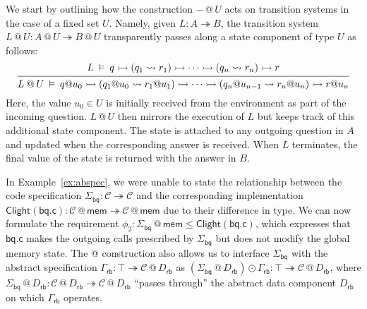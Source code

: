 \documentclass[acmsmall,screen,review,anonymous]{acmart}
\newcommand{\kw}[1]{\ensuremath{ \mathsf{#1} }}
\begin{document}
We start by
outlining how the construction ${-} \mathbin@ U$
acts on transition systems
in the case of a fixed set $U$.
Namely,
given $L : A \twoheadrightarrow B$,
the transition system
$
  L \mathbin@ U : A \mathbin@ U \twoheadrightarrow B \mathbin@ U
$
transparently passes along
a state component of type $U$ as follows:
\begin{equation} \label{eqn:slift}
  \begin{prooftree}
  \hypo{
  L \:\vDash\: q \rightarrowtail
    (q_1 \leadsto r_1) \rightarrowtail
    \cdots \rightarrowtail
    (q_n \leadsto r_n) \rightarrowtail
    r
  }
  \infer1{
  L \mathbin@ U \:\vDash\: q@u_0 \rightarrowtail
    (q_1@u_0 \leadsto r_1@u_1) \rightarrowtail
    \cdots \rightarrowtail
    (q_n@u_{n-1} \leadsto r_n@u_n) \rightarrowtail
    r@u_n
  }
  \end{prooftree}
\end{equation}
Here, the value $u_0 \in U$
is initially received from the environment as part of the incoming question.
$L \mathbin@ U$ then mirrors the execution of $L$
but keeps track of this additional state component.
The state is attached to any outgoing question in $A$
and updated when the corresponding answer is received.
When $L$ terminates,
the final value of the state is returned with the answer in $B$.

\begin{example} \label{ex:abspeclift} %
In Example~\ref{ex:abspec},
we were unable to state the relationship
between the code specification
$\Sigma_\kw{bq} : \mathcal{C} \twoheadrightarrow \mathcal{C}$
and the corresponding implementation
$\kw{Clight}(\kw{bq.c}) : \mathcal{C} \mathbin@ \kw{mem}
 \twoheadrightarrow \mathcal{C} \mathbin@ \kw{mem}$
due to their difference in type.
We can now formulate the requirement
$
  \phi_2 : \Sigma_\kw{bq} \mathbin@ \kw{mem} \le \kw{Clight}(\kw{bq.c})
$,
which expresses that $\kw{bq.c}$
makes the outgoing calls prescribed by $\Sigma_\kw{bq}$
but does not modify the global memory state.
The $@$ construction also allows us to interface $\Sigma_\kw{bq}$
with the abstract specification
$\Gamma_\kw{rb} : \top \twoheadrightarrow \mathcal{C} \mathbin@ D_\kw{rb}$
as
$
  (\Sigma_\kw{bq} \mathbin@ D_\kw{rb}) \odot \Gamma_\kw{rb} :
  \top \twoheadrightarrow \mathcal{C} \mathbin@ D_\kw{rb}
$,
where
$\Sigma_\kw{bq} \mathbin@ D_\kw{rb} :
 \mathcal{C} \mathbin@ D_\kw{rb}
 \twoheadrightarrow
 \mathcal{C} \mathbin@ D_\kw{rb}$
``passes through'' the abstract data component $D_\kw{rb}$
on which $\Gamma_\kw{rb}$ operates.
\end{example}
\end{document}

